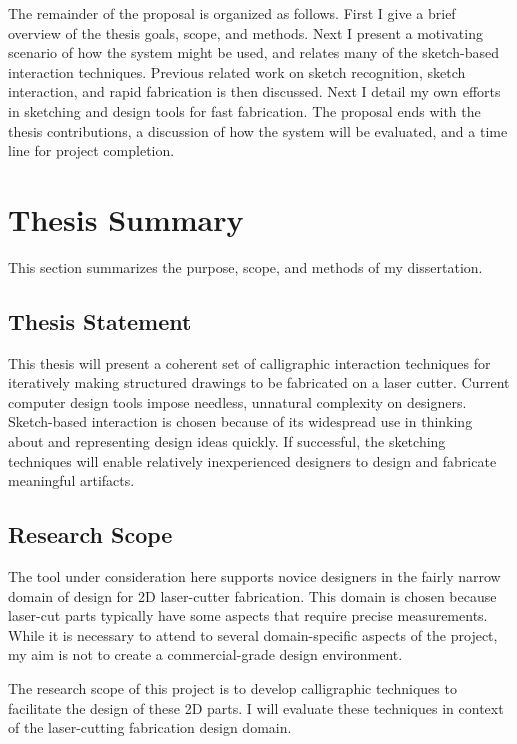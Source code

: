\documentclass[12pt]{article}
\begin{document}
The remainder of the proposal is organized as follows. First I give a
brief overview of the thesis goals, scope, and methods. Next I present
a motivating scenario of how the system might be used, and relates
many of the sketch-based interaction techniques. Previous related work
on sketch recognition, sketch interaction, and rapid fabrication is
then discussed. Next I detail my own efforts in sketching and design
tools for fast fabrication. The proposal ends with the thesis
contributions, a discussion of how the system will be evaluated, and a
time line for project completion.

\section{Thesis Summary}

This section summarizes the purpose, scope, and methods of my
dissertation.

\subsection{Thesis Statement}

This thesis will present a coherent set of calligraphic interaction
techniques for iteratively making structured drawings to be fabricated
on a laser cutter. Current computer design tools impose needless,
unnatural complexity on designers. Sketch-based interaction is chosen
because of its widespread use in thinking about and representing
design ideas quickly. If successful, the sketching techniques will
enable relatively inexperienced designers to design and fabricate
meaningful artifacts.

\subsection{Research Scope}

The tool under consideration here supports novice designers in the
fairly narrow domain of design for 2D laser-cutter fabrication. This
domain is chosen because laser-cut parts typically have some aspects
that require precise measurements. While it is necessary to attend to
several domain-specific aspects of the project, my aim is not to
create a commercial-grade design environment.

The research scope of this project is to develop calligraphic
techniques to facilitate the design of these 2D parts. I will evaluate
these techniques in context of the laser-cutting fabrication design
domain.
\end{document}
